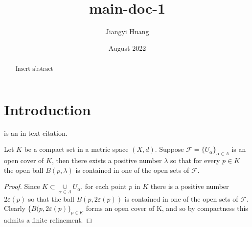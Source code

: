 \documentclass{article}
\title{main-doc-1}
\author{Jiangyi Huang}
\date{August 2022}
\begin{document}
\maketitle

\begin{abstract}
Insert abstract
\end{abstract}


\section{Introduction}

\mydef \cite{einstein} is an in-text citation.

\thm Let $K$ be a compact set in a metric space $(X,d)$. Suppose $\mathcal{F}=\{U_\alpha\}_{\alpha \in A}$ is an open cover of $K$, then there exists a positive number $\lambda$ so that for every $p \in K$ the open ball $B(p,\lambda)$ is contained in one of the open sets of $\mathcal{F}$.

\begin{proof}

Since $K \subset \underset{\alpha \in A}\cup U_\alpha$, for each point $p$ in $K$ there is a positive number $2\varepsilon(p)$ so that the ball $B(p,2\varepsilon(p))$ is contained in one of the open sets of $\mathcal{F}$. Clearly $\{B(p,2\varepsilon(p)\}_{p \in K}$ forms an open cover of K, and so by compactness this admits a finite refinement.

\end{proof}

\newpage


\end{document}
